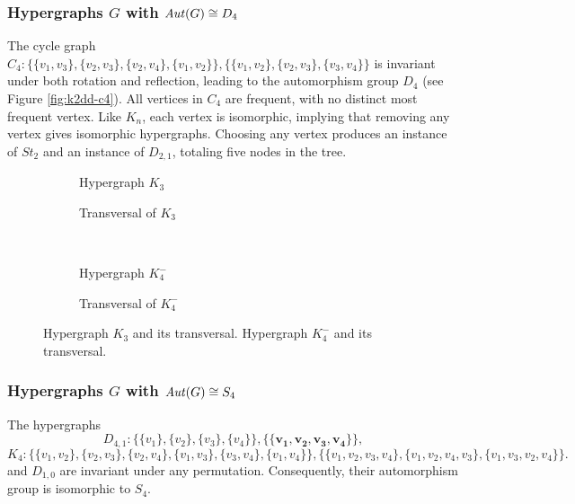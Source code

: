 \subsubsection*{Hypergraphs $G$ with $\mathit{Aut}(G)\cong D_4$}

The cycle graph $C_4:\{\{v_1,v_3\},\{v_2,v_3\},\{v_2,v_4\},\{v_1,v_2\}\},\{\{v_1,v_2\},\{v_2,v_3\},\{v_3,v_4\}\}$ is invariant under both rotation and reflection, leading to the automorphism group $D_4$ (see Figure \ref{fig:k2dd-c4}). All vertices in $C_4$ are frequent, with no distinct most frequent vertex. Like $K_n$, each vertex is isomorphic, implying that removing any vertex gives isomorphic hypergraphs. Choosing any vertex produces an instance of $St_2$ and an instance of $D_{2,1}$, totaling five nodes in the tree.

\begin{figure}[tp]
\centering
\begin{subfigure}{0.45\linewidth}\centering\caption{Hypergraph $K_3$}\end{subfigure}\hfill
\begin{subfigure}{0.45\linewidth}\centering\caption{Transversal of $K_3$}\end{subfigure}\\[8pt]
\begin{subfigure}{0.45\linewidth}\centering\caption{Hypergraph $K_4^-$}\end{subfigure}\hfill
\begin{subfigure}{0.45\linewidth}\centering\caption{Transversal of $K_4^-$}\end{subfigure}
\caption{Hypergraph $K_3$ and its transversal. Hypergraph $K_4^-$ and its transversal.}\label{fig:k3-k4minus}
\end{figure}

\subsubsection*{Hypergraphs $G$ with $\mathit{Aut}(G)\cong S_4$}

The hypergraphs
\[
D_{4,1}:\{\{v_1\},\{v_2\},\{v_3\},\{v_4\}\},\{\{\mathbf{v_1},\mathbf{v_2},\mathbf{v_3},\mathbf{v_4}\}\},
\]
\[
K_4:\{\{v_1,v_2\},\{v_2,v_3\},\{v_2,v_4\},\{v_1,v_3\},\{v_3,v_4\},\{v_1,v_4\}\},\{\{v_1,v_2,v_3,v_4\},\{v_1,v_2,v_4,v_3\},\{v_1,v_3,v_2,v_4\}\}.
\]
and $D_{1,0}$ are invariant under any permutation. Consequently, their automorphism group is isomorphic to $S_4$.

